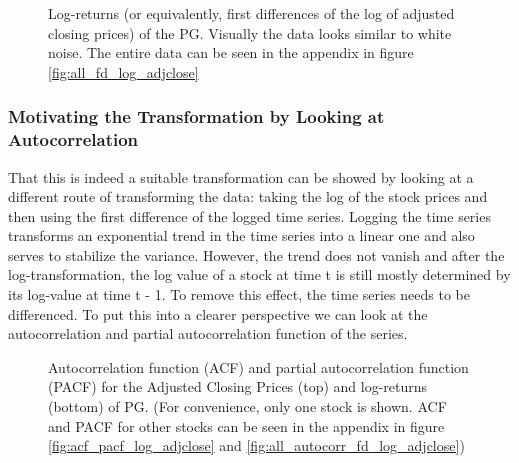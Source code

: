 \begin{figure}[h!]
    \centering
    \begin{adjustbox}{width=.9\textwidth,center}
    
    \end{adjustbox}  
    \caption{Log-returns (or equivalently, first differences of the log of adjusted closing prices) of the PG. Visually the data looks similar to white noise. The entire data can be seen in the appendix in figure \ref{fig:all_fd_log_adjclose}}
    \label{fig:PG_fd_log_adjclose}
\end{figure}{}

\subsubsection{Motivating the Transformation by Looking at Autocorrelation}
That this is indeed a suitable transformation can be showed by looking at a different route of transforming the data: taking the log of the stock prices and then using the first difference of the logged time series. Logging the time series transforms an exponential trend in the time series into a linear one and also serves to stabilize the variance. However, the trend does not vanish and after the log-transformation, the log value of a stock at time t is still mostly determined by its log-value at time t - 1. To remove this effect, the time series needs to be differenced. To put this into a clearer perspective we can look at the autocorrelation and partial autocorrelation function of the series. 

\begin{figure}[h!]
    \centering
    \begin{adjustbox}{width=.95\textwidth,center}
    
    \end{adjustbox}  
    \hspace{3ex}
    \begin{adjustbox}{width=.95\textwidth,center}
    
    \end{adjustbox}
    \caption{Autocorrelation function (ACF) and partial autocorrelation function (PACF) for the Adjusted Closing Prices (top) and log-returns (bottom) of PG. (For convenience, only one stock is shown. ACF and PACF for other stocks can be seen in the appendix in figure \ref{fig:acf_pacf_log_adjclose} and  \ref{fig:all_autocorr_fd_log_adjclose})}
    \label{fig:acf_pacf_log_adjclose_PG}
\end{figure}{}

